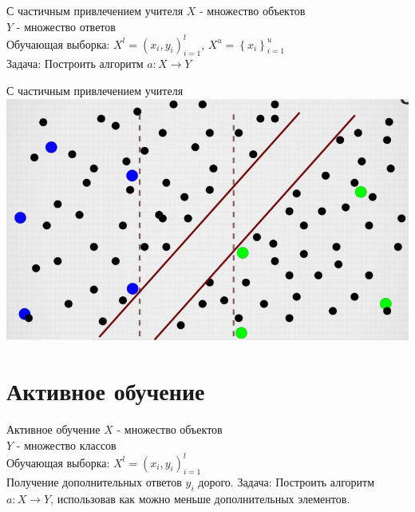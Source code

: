 \documentclass[10pt]{beamer}
\begin{document}
{
\begin{frame}{С частичным привлечением учителя}
  $X$ - множество объектов \\
	$Y$ - множество ответов \\
	Обучающая выборка: ${X^l = (x_i, y_i)_{i=1}^l}$, ${X^u = \left\{x_i\right\}_{i=1}^u}$ \\  
	\bigbreak
	\bigbreak
	\alert{Задача}: Построить алгоритм ${a \colon X \rightarrow Y}$
\end{frame}
}

{
\begin{frame}{С частичным привлечением учителя}
  \centering
  \includegraphics[width=0.9 \linewidth, height=0.9 \textheight, keepaspectratio]{images/semi}\\
\end{frame}
}

\section{Активное обучение}

{
\begin{frame}{Активное обучение}
  $X$ - множество объектов \\
	$Y$ - множество классов \\
	Обучающая выборка: ${X^l = (x_i, y_i)_{i=1}^l}$ \\ 
	Получение дополнительных ответов $y_i$ \alert{дорого}.
	\bigbreak
	\bigbreak
	\alert{Задача}: Построить алгоритм ${a \colon X \rightarrow Y}$, использовав как можно меньше дополнительных элементов.
\end{frame}
}
\end{document}
